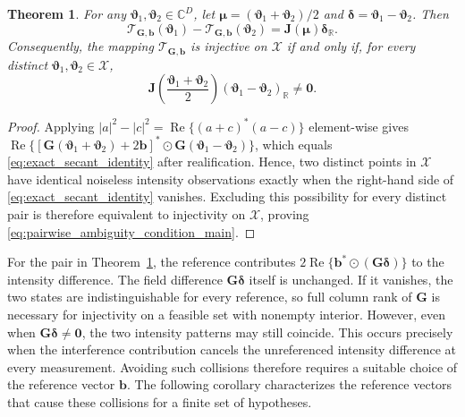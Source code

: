 \documentclass[journal]{IEEEtran}
\newtheorem{theorem}{Theorem}
\begin{document}
\begin{theorem}
\label{thm:exact_secant_uniqueness}
For any $\boldsymbol\vartheta_1,\boldsymbol\vartheta_2\in\mathbb C^D$, let
$\boldsymbol\mu=(\boldsymbol\vartheta_1+\boldsymbol\vartheta_2)/2$ and
$\boldsymbol\delta=\boldsymbol\vartheta_1-\boldsymbol\vartheta_2$.  Then
\begin{equation}
\mathcal T_{\mathbf G,\mathbf b}(\boldsymbol\vartheta_1)
-
\mathcal T_{\mathbf G,\mathbf b}(\boldsymbol\vartheta_2)
=
\mathbf J(\boldsymbol\mu)\boldsymbol\delta_{\mathbb R}.
\label{eq:exact_secant_identity}
\end{equation}
Consequently, the mapping $\mathcal T_{\mathbf G,\mathbf b}$ is injective on
$\mathcal X$ if and only if, for every distinct
$\boldsymbol\vartheta_1,\boldsymbol\vartheta_2\in\mathcal X$,
\begin{equation}
\mathbf J\!\left(
\frac{\boldsymbol\vartheta_1+\boldsymbol\vartheta_2}{2}
\right)
(\boldsymbol\vartheta_1-\boldsymbol\vartheta_2)_{\mathbb R}
\ne\mathbf0 .
\label{eq:pairwise_ambiguity_condition_main}
\end{equation}
\end{theorem}
\begin{proof}
Applying $|a|^2-|c|^2=\operatorname{Re}\{(a+c)^*(a-c)\}$
element-wise gives
$\operatorname{Re}\{[\mathbf G(\boldsymbol\vartheta_1+\boldsymbol\vartheta_2)
+2\mathbf b]^*\odot\mathbf G(\boldsymbol\vartheta_1-\boldsymbol\vartheta_2)\}$,
which equals \eqref{eq:exact_secant_identity} after realification.  Hence, two
distinct points in $\mathcal X$ have identical noiseless intensity observations
exactly when the right-hand side of \eqref{eq:exact_secant_identity} vanishes.
Excluding this possibility for every distinct pair is therefore equivalent to
injectivity on $\mathcal X$, proving \eqref{eq:pairwise_ambiguity_condition_main}.
\end{proof}

For the pair in Theorem~\ref{thm:exact_secant_uniqueness}, the
reference contributes
$2\operatorname{Re}\{\mathbf b^*\odot(\mathbf G\boldsymbol\delta)\}$
to the intensity difference. The field difference
$\mathbf G\boldsymbol\delta$ itself is unchanged. If it vanishes,
the two states are indistinguishable for every reference, so full
column rank of $\mathbf G$ is necessary for injectivity on a
feasible set with nonempty interior. However, even when
$\mathbf G\boldsymbol\delta\neq\mathbf 0$, the two intensity patterns
may still coincide. This occurs precisely when the interference
contribution cancels the unreferenced intensity difference at every
measurement. Avoiding such collisions therefore requires a suitable
choice of the reference vector $\mathbf b$. The following corollary
characterizes the reference vectors that cause these collisions
for a finite set of hypotheses.
\end{document}
